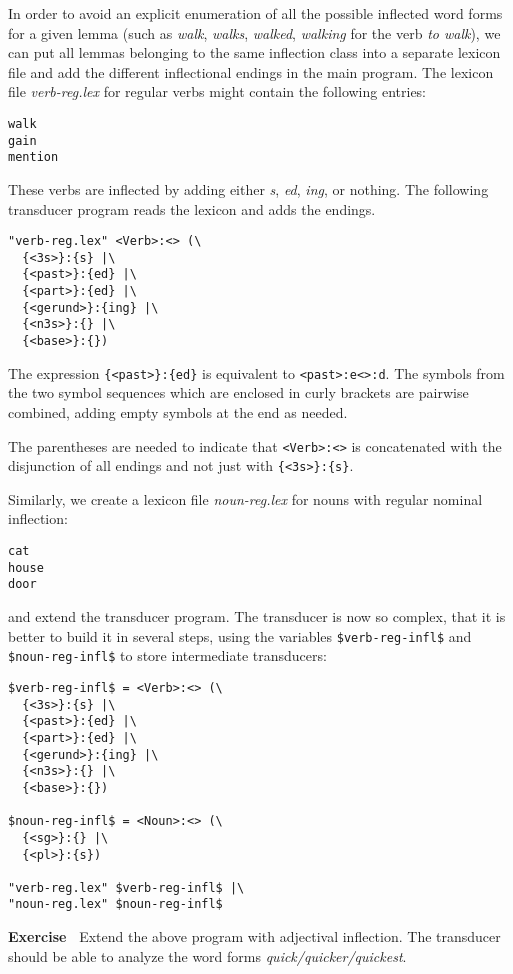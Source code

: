 \documentclass[11pt]{article}
\newenvironment{exercise}{

  \hrulefill\nopagebreak

  \textbf{Exercise~}}
{

  \nopagebreak\hrulefill\vspace{0.2cm}

}
\begin{document}
In order to avoid an explicit enumeration of all the possible
inflected word forms for a given lemma (such as \emph{walk},
\emph{walks}, \emph{walked}, \emph{walking} for the verb \emph{to
  walk}), we can put all lemmas belonging to the same inflection class
into a separate lexicon file and add the different inflectional
endings in the main program. The lexicon file \emph{verb-reg.lex} for
regular verbs might contain the following entries:
\begin{verbatim}
walk
gain
mention
\end{verbatim}
These verbs are inflected by adding either \emph{s}, \emph{ed},
\emph{ing}, or nothing. The following transducer program reads the
lexicon and adds the endings.
\begin{verbatim}
"verb-reg.lex" <Verb>:<> (\
  {<3s>}:{s} |\
  {<past>}:{ed} |\
  {<part>}:{ed} |\
  {<gerund>}:{ing} |\
  {<n3s>}:{} |\
  {<base>}:{})
\end{verbatim}

The expression \verb#{<past>}:{ed}# is equivalent to
\verb#<past>:e<>:d#. The symbols from the two symbol sequences which
are enclosed in curly brackets are pairwise combined, adding empty
symbols at the end as needed.

The parentheses are needed to indicate that \verb#<Verb>:<># is
concatenated with the disjunction of all endings and not just with
\verb#{<3s>}:{s}#.

Similarly, we create a lexicon file \emph{noun-reg.lex} for nouns with
regular nominal inflection:

\begin{verbatim}
cat
house
door
\end{verbatim}

and extend the transducer program. The transducer is now so complex,
that it is better to build it in several steps, using the variables
\verb#$verb-reg-infl$# and \verb#$noun-reg-infl$# to store intermediate
transducers:

\begin{verbatim}
$verb-reg-infl$ = <Verb>:<> (\
  {<3s>}:{s} |\
  {<past>}:{ed} |\
  {<part>}:{ed} |\
  {<gerund>}:{ing} |\
  {<n3s>}:{} |\
  {<base>}:{})

$noun-reg-infl$ = <Noun>:<> (\
  {<sg>}:{} |\
  {<pl>}:{s})

"verb-reg.lex" $verb-reg-infl$ |\
"noun-reg.lex" $noun-reg-infl$
\end{verbatim}

\begin{exercise}
  Extend the above program with adjectival inflection. The transducer
  should be able to analyze the word forms
  \emph{quick/quicker/quickest}.
\end{exercise}
\end{document}
